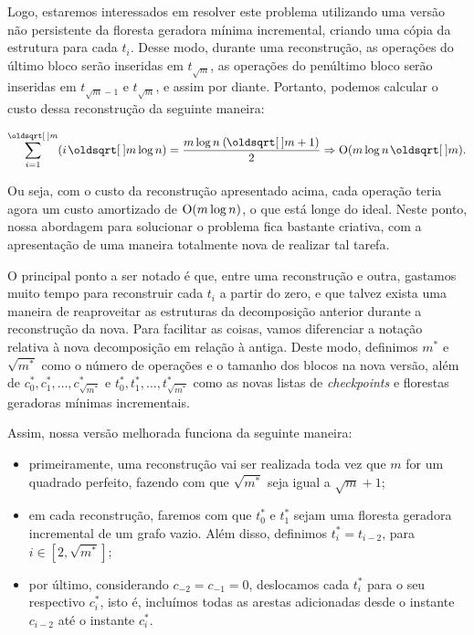 Logo, estaremos interessados em resolver este problema utilizando uma versão não persistente da floresta geradora mínima incremental, criando uma cópia da estrutura para cada $t_i$. Desse modo, durante uma reconstrução, as operações do último bloco serão inseridas em $t_{\sqrt{m}}$, as operações do penúltimo bloco serão inseridas em $t_{\sqrt{m} - 1}$ e $t_{\sqrt{m}}$, e assim por diante. Portanto, podemos calcular o custo dessa reconstrução da seguinte maneira:

\begin{equation}
    \sum_{i=1}^{\sqrt{m}} (i \sqrt{m} \log n) =
    \frac{m \log n \: (\sqrt{m} + 1)}{2} \Rightarrow
    \Oh(m \log n \sqrt{m}).
\end{equation}

Ou seja, com o custo da reconstrução apresentado acima, cada operação teria agora um custo amortizado de $\mathrm{O}(m \log n)$, o que está longe do ideal. Neste ponto, nossa abordagem para solucionar o problema fica bastante criativa, com a apresentação de uma maneira totalmente nova de realizar tal tarefa.

O principal ponto a ser notado é que, entre uma reconstrução e outra, gastamos muito tempo para reconstruir cada $t_i$ a partir do zero, e que talvez exista uma maneira de reaproveitar as estruturas da decomposição anterior durante a reconstrução da nova. Para facilitar as coisas, vamos diferenciar a notação relativa à nova decomposição em relação à antiga. Deste modo, definimos $m^*$ e $\sqrt{m^*}$ como o número de operações e o tamanho dos blocos na nova versão, além de $c_0^*, c_1^*, \dots, c_{\sqrt{m^*}}^*$ e $t_0^*, t_1^*, \dots, t_{\sqrt{m^*}}^*$ como as novas listas de \emph{checkpoints} e florestas geradoras mínimas incrementais.

Assim, nossa versão melhorada funciona da seguinte maneira:

\begin{itemize}
    \item primeiramente, uma reconstrução vai ser realizada toda vez que $m$ for um quadrado perfeito, fazendo com que $\sqrt{m^*} $ seja igual a $\sqrt{m} + 1$;
    \item em cada reconstrução, faremos com que $t_0^*$ e $t_1^*$ sejam uma floresta geradora incremental de um grafo vazio. Além disso, definimos $t_i^* = t_{i-2}$, para $i \in [2, \sqrt{m^*}]$;
    \item por último, considerando $c_{-2} = c_{-1} = 0$, deslocamos cada $t_i^*$ para o seu respectivo $c_i^*$, isto é, incluímos todas as arestas adicionadas desde o instante $c_{i-2}$ até o instante $c_i^*$.
\end{itemize}

